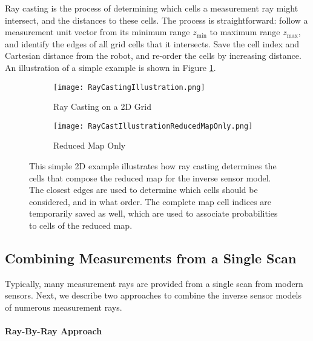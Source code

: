 Ray casting is the process of determining which cells a measurement ray might intersect, and the distances to these cells. The process is straightforward: follow a measurement unit vector from its minimum range $z_\text{min}$ to maximum range $z_\text{max}$, and identify the edges of all grid cells that it intersects. Save the cell index and Cartesian distance from the robot, and re-order the cells by increasing distance. An illustration of a simple example is shown in Figure \ref{fig:RayCastingIllustration}.

\begin{figure}[!ht]
    \centering
    \begin{subfigure}[t]{0.4\columnwidth}
        \centering
        \texttt{[image: RayCastingIllustration.png]}
        \caption{Ray Casting on a 2D Grid}
    \end{subfigure}
    \hspace*{0.05\columnwidth}
    \begin{subfigure}[t]{0.4\columnwidth}
        \centering
        \texttt{[image: RayCastIllustrationReducedMapOnly.png]}
        \caption{Reduced Map Only}
    \end{subfigure}
    \caption{This simple 2D example illustrates how ray casting determines the cells that compose the reduced map for the inverse sensor model. The closest edges are used to determine which cells should be considered, and in what order. The complete map cell indices are temporarily saved as well, which are used to associate probabilities to cells of the reduced map.}
    \label{fig:RayCastingIllustration}
\end{figure}

\subsection{Combining Measurements from a Single Scan}
\label{sec:RayScanComb}
Typically, many measurement rays are provided from a single scan from modern sensors.
Next, we describe two approaches to combine the inverse sensor models of numerous measurement rays.

\paragraph{Ray-By-Ray Approach}

